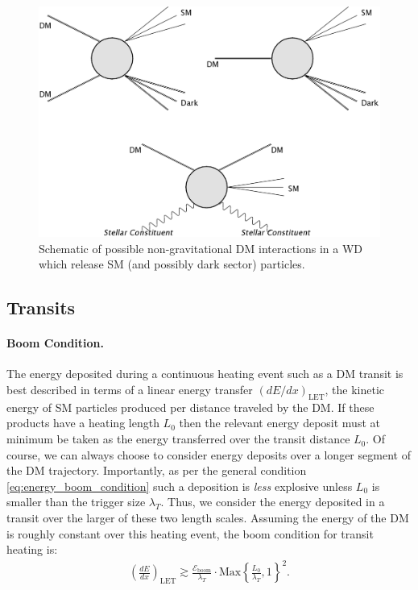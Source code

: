 \documentclass[twocolumn, preprintnumbers,amsmath,amssymb,prd, superscriptaddress]{revtex4}
\newcommand{\Eboom}{\mathcal{E}_\text{boom}}
\begin{document}
\begin{figure}
\includegraphics[scale=0.09]{feynman.png}
\caption{Schematic of possible non-gravitational DM interactions in a WD which release SM (and possibly dark sector) particles.}
\label{fig:feynman}
\end{figure}

\subsection{Transits}

\paragraph{Boom Condition.}
The energy deposited during a continuous heating event such as a DM transit is best described in terms of a linear energy transfer $(dE/dx)_\text{LET}$, the kinetic energy of SM particles produced per distance traveled by the DM.
If these products have a heating length $L_0$ then the relevant energy deposit must at minimum be taken as the energy transferred over the transit distance $L_0$.
Of course, we can always choose to consider energy deposits over a longer segment of the DM trajectory.
Importantly, as per the general condition \eqref{eq:energy_boom_condition} such a deposition is \emph{less} explosive unless $L_0$ is smaller than the trigger size $\lambda_T$.
Thus, we consider the energy deposited in a transit over the larger of these two length scales.
Assuming the energy of the DM is roughly constant over this heating event, the boom condition for transit heating is:
\begin{align}
\label{eq:transitexplosion}
  \left( \frac{d E}{d x} \right)_\text{LET} \gtrsim
  \frac{\Eboom}{\lambda_T} \cdot \text{Max}
  \left\{\frac{L_0}{\lambda_T}, 1 \right\}^2.
\end{align}
\end{document}

